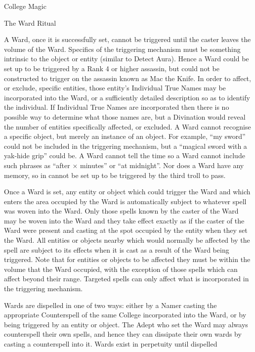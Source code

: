 \begin{Chapter}{College Magic}
\begin{ritual}{The Ward Ritual}
\begin{effects}
A Ward, once it is successfully set, cannot be triggered until the
caster leaves the volume of the Ward.  Specifics of the triggering
mechanism must be something intrinsic to the object or entity (similar
to Detect Aura). Hence a Ward could be set up to be triggered by a
Rank 4 or higher assassin, but could not be constructed to trigger on
the assassin known as Mac the Knife.  In order to affect, or exclude,
specific entities, those entity’s Individual True Names may be
incorporated into the Ward, or a sufficiently detailed description so
as to identify the individual. If Individual True Names are
incorporated then there is no possible way to determine what those
names are, but a Divination would reveal the number of entities
specifically affected, or excluded.  A Ward cannot recognise a
specific object, but merely an instance of an object.  For example,
“my sword” could not be included in the triggering mechanism, but a
“magical sword with a yak-hide grip” could be.  A Ward cannot tell the
time so a Ward cannot include such phrases as “after × minutes” or “at
midnight”.  Nor does a Ward have any memory, so in cannot be set up to
be triggered by the third troll to pass.

Once a Ward is set, any entity or object which could trigger the Ward
and which enters the area occupied by the Ward is automatically
subject to whatever spell was woven into the Ward.  Only those spells
known by the caster of the Ward may be woven into the Ward and they
take effect exactly as if the caster of the Ward were present and
casting at the spot occupied by the entity when they set the Ward.
All entities or objects nearby which would normally be affected by the
spell are subject to its effects when it is cast as a result of the
Ward being triggered.  Note that for entities or objects to be
affected they must be within the volume that the Ward occupied, with
the exception of those spells which can affect beyond their range.
Targeted spells can only affect what is incorporated in the triggering
mechanism.

Wards are dispelled in one of two ways: either by a Namer casting the
appropriate Counterspell of the same College incorporated into the
Ward, or by being triggered by an entity or object.  The Adept who set
the Ward may always counterspell their own spells, and hence they can
dissipate their own wards by casting a counterspell into it. Wards
exist in perpetuity until dispelled
\end{effects}
\end{ritual}



\end{Chapter}
